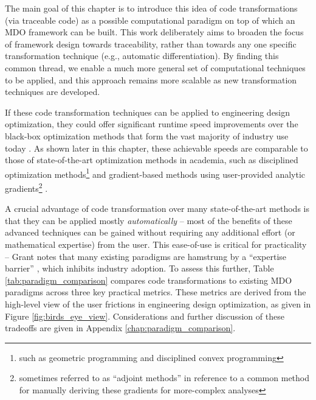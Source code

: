 The main goal of this chapter is to introduce this idea of code transformations (via traceable code) as a possible computational paradigm on top of which an MDO framework can be built. This work deliberately aims to broaden the focus of framework design towards traceability, rather than towards any one specific transformation technique (e.g., automatic differentiation). By finding this common thread, we enable a much more general set of computational techniques to be applied, and this approach remains more scalable as new transformation techniques are developed.

If these code transformation techniques can be applied to engineering design optimization, they could offer significant runtime speed improvements over the black-box optimization methods that form the vast majority of industry use today \cite{martins_engineering_2021, lavin_simulation_2022}. As shown later in this chapter, these achievable speeds are comparable to those of state-of-the-art optimization methods in academia, such as disciplined optimization methods\footnote{such as geometric programming and disciplined convex programming} \cite{grant_disciplined_2006, gpkit, boyd_convex_2004, agrawal_disciplined_2019} and gradient-based methods using user-provided analytic gradients\footnote{sometimes referred to as ``adjoint methods'' in reference to a common method for manually deriving these gradients for more-complex analyses} \cite{gray_openmdao_2019, kenway_effective_2019, innes_don_2019}.

A crucial advantage of code transformation over many state-of-the-art methods is that they can be applied mostly \textit{automatically} -- most of the benefits of these advanced techniques can be gained without requiring any additional effort (or mathematical expertise) from the user. This ease-of-use is critical for practicality -- Grant notes that many existing paradigms are hamstrung by a ``expertise barrier'' \cite{grant_disciplined_2006}, which inhibits industry adoption. To assess this further, Table \ref{tab:paradigm_comparison} compares code transformations to existing MDO paradigms across three key practical metrics. These metrics are derived from the high-level view of the user frictions in engineering design optimization, as given in Figure \ref{fig:birds_eye_view}. Considerations and further discussion of these tradeoffs are given in Appendix \ref{chap:paradigm_comparison}.

